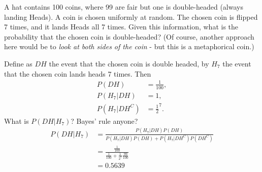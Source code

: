 

\setcounter{theorem}{3}

\begin{exercise}[BH.2.4]
A hat contains 100 coins, where 99 are fair but one is double-headed (always landing Heads). A coin is chosen uniformly at random. The chosen coin is flipped 7 times, and it lands Heads all 7 times. Given this information, what is the probability that the chosen coin is double-headed? (Of course, another approach here would be to \emph{look at both sides of the coin} - but this is a metaphorical coin.)
\begin{solution}
	Define as $DH$ the event that the chosen coin is double headed, by $H_{7}$ the event that the chosen coin lands heads 7 times. Then
	\begin{align*}
		P(DH) &= \frac{1}{100},\\
		P(H_{7}|DH) & = 1,\\
		P(H_{7}|DH^{C}) & = \frac{1}{2}^7.
	\end{align*}
	What is $P(DH|H_{7})$? Bayes' rule anyone?
	\begin{align*}
		P(DH|H_{7}) &= \frac{P(H_{7}|DH)P(DH)}{P(H_{7}|DH)P(DH) + P(H_{7}|DH^{C})P(DH^{C})}\\
		& = \frac{\frac{1}{100}}{\frac{1}{100} + \frac{1}{2^7}\frac{99}{100}}\\
		& = 0.5639
	\end{align*}
\end{solution}
\end{exercise}


